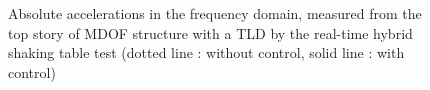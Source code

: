 \begin{figure}[!ht]
\centering
 \hfill
 \hfill
\caption{Absolute accelerations in the frequency domain, measured from the top story of MDOF structure with a TLD by the real-time hybrid shaking table test (dotted line : without control, solid line : with control)}
\label{fig:3-11}
\end{figure}

